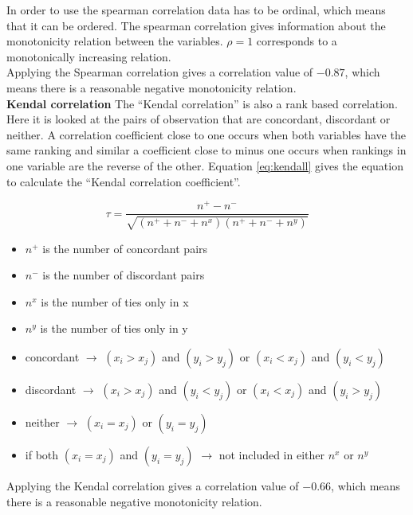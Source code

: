 In order to use the spearman correlation data has to be ordinal, which means that it can be ordered. The spearman correlation gives information about the monotonicity relation between the variables. $ \rho = 1 $ corresponds to a monotonically increasing relation.\\

Applying the Spearman correlation  gives a correlation value of $ -0.87$, which means there is a reasonable negative monotonicity relation.\\

\textbf{Kendal correlation}
The ``Kendal correlation'' is also a rank based correlation. Here it is looked at the pairs of observation that are concordant, discordant or neither. A correlation coefficient close to one occurs when both variables have the same ranking and similar a coefficient close to minus one occurs when rankings in one variable are the reverse of the other. Equation \ref{eq:kendall} gives the equation to calculate the ``Kendal correlation coefficient''.

\begin{equation}\label{eq:kendall}
	\tau = \frac{n^+-n^-}{\sqrt{(n^++n^-+n^x)(n^++n^-+n^y)}}
\end{equation}
\begin{itemize}
	\item $ n^+ $ is the number of concordant pairs
	\item $ n^- $ is the number of discordant pairs
	\item $ n^x $ is the number of ties only in x
	\item $ n^y $ is the number of ties only in y
	\item concordant $\rightarrow $ $ (x_i > x_j ) $ and $ (y_i > y_j ) $ or $ (x_i < x_j ) $ and $ (y_i < y_j ) $
	\item discordant $\rightarrow $ $ (x_i > x_j ) $ and $ (y_i < y_j ) $ or $ (x_i < x_j ) $ and $ (y_i > y_j ) $
	\item neither $\rightarrow $ $ (x_i = x_j ) $ or $ (y_i = y_j ) $
	\item if both $ (x_i = x_j ) $ and $ (y_i = y_j ) $ $\rightarrow $ not included in either $ n^x $ or $ n^y $
\end{itemize}

Applying the Kendal correlation  gives a correlation value of $ -0.66$, which means there is a reasonable negative monotonicity relation.\\



